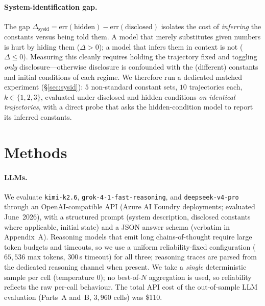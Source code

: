 \documentclass{article}
\begin{document}
\paragraph{System-identification gap.} The gap $\Delta_{\mathrm{sysid}}=
\mathrm{err}(\text{hidden})-\mathrm{err}(\text{disclosed})$ isolates the cost of
\emph{inferring} the constants versus being told them. A model that merely
substitutes given numbers is hurt by hiding them ($\Delta>0$); a model that infers
them in context is not ($\Delta\le0$). Measuring this cleanly requires holding the
trajectory fixed and toggling \emph{only} disclosure---otherwise disclosure is
confounded with the (different) constants and initial conditions of each regime. We
therefore run a dedicated matched experiment (\S\ref{sec:sysid}): $5$ non-standard
constant sets, $10$ trajectories each, $k\in\{1,2,3\}$, evaluated under disclosed
and hidden conditions \emph{on identical trajectories}, with a direct probe that
asks the hidden-condition model to report its inferred constants.

\section{Methods}
\label{sec:methods}

\paragraph{LLMs.} We evaluate \texttt{kimi-k2.6}, \texttt{grok-4-1-fast-reasoning},
and \texttt{deepseek-v4-pro} through an OpenAI-compatible API (Azure AI Foundry
deployments; evaluated June~2026), with a structured prompt (system description,
disclosed constants where applicable, initial state) and a JSON answer schema
(verbatim in Appendix~A). Reasoning models that emit long
chains-of-thought require large token budgets and timeouts, so we use a uniform
reliability-fixed configuration ($65{,}536$ max tokens, $300$\,s timeout) for all
three; reasoning traces are parsed from the dedicated reasoning channel when
present. We take a \emph{single} deterministic sample per cell (temperature $0$); no
best-of-$N$ aggregation is used, so reliability reflects the raw per-call behaviour.
The total API cost of the out-of-sample LLM evaluation (Parts~A and~B,
$3{,}960$ cells) was \$110.
\end{document}
